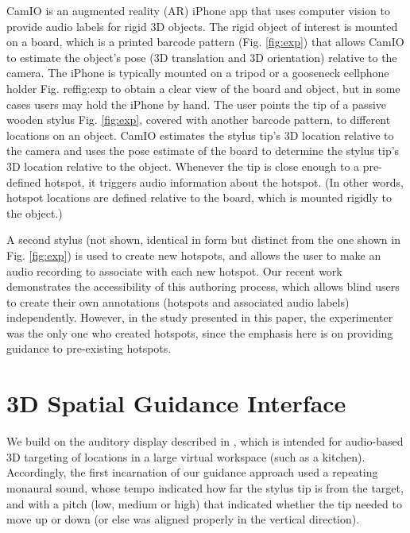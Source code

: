 \documentclass[runningheads]{res/templates/llncs}
\begin{document}
CamIO is an augmented reality (AR) iPhone app that uses computer vision
to provide audio labels for rigid 3D objects. The rigid object of
interest is mounted on a board, which is a printed barcode pattern
(Fig. \ref{fig:exp}) that allows CamIO to estimate the object's pose (3D
translation and 3D orientation) relative to the camera. The iPhone is
typically mounted on a tripod or a gooseneck cellphone holder
Fig. ref{fig:exp} to obtain a clear view of the board and object, but in
some cases \cite{coughlanTowardsAccessibleAudioLabeling2020} users may
hold the iPhone by hand. The user points the tip of a passive wooden
stylus Fig. \ref{fig:exp}, covered with another barcode pattern, to different
locations on an object. CamIO estimates the stylus tip's 3D location
relative to the camera and uses the pose estimate of the board to
determine the stylus tip's 3D location relative to the object. Whenever
the tip is close enough to a pre-defined hotspot, it triggers audio
information about the hotspot. (In other words, hotspot locations are
defined relative to the board, which is mounted rigidly to the object.)

A second stylus (not shown, identical in form but distinct from the one
shown in Fig. \ref{fig:exp}) is used to create new hotspots, and allows the
user to make an audio recording to associate with each new hotspot. Our
recent work \cite{coughlanTowardsAccessibleAudioLabeling2020}
demonstrates the accessibility of this authoring process, which allows
blind users to create their own annotations (hotspots and associated
audio labels) independently. However, in the study presented in this
paper, the experimenter was the only one who created hotspots, since the
emphasis here is on providing guidance to pre-existing hotspots.

\hypertarget{material}{%
\section{3D Spatial Guidance Interface}\label{material}}

We build on the auditory display described in
\cite{mayAuditoryDisplaysFacilitate2019}, which is intended for
audio-based 3D targeting of locations in a large virtual workspace (such
as a kitchen). Accordingly, the first incarnation of our guidance
approach used a repeating monaural sound, whose tempo indicated how far
the stylus tip is from the target, and with a pitch (low, medium or
high) that indicated whether the tip needed to move up or down (or else
was aligned properly in the vertical direction).
\end{document}
